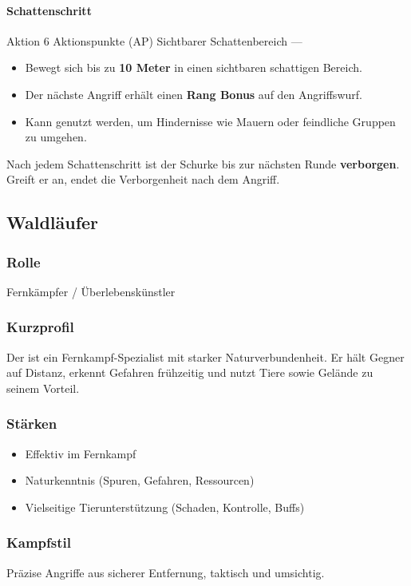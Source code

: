 \paragraph*{Schattenschritt}
\skillcard
{}
{Aktion}
{6 Aktionspunkte (AP)}
{Sichtbarer Schattenbereich}
{—}
{
	\begin{itemize}
		\item Bewegt sich bis zu \textbf{10 Meter} in einen sichtbaren
		schattigen Bereich.
		\item Der nächste Angriff erhält einen \textbf{Rang Bonus}
		auf den Angriffswurf.
		\item Kann genutzt werden, um Hindernisse wie Mauern oder
		feindliche Gruppen zu umgehen.
	\end{itemize}
}
{
	Nach jedem Schattenschritt ist der Schurke bis zur
	nächsten Runde \textbf{verborgen}.
	Greift er an, endet die Verborgenheit nach dem Angriff.
}

\subsection{Waldläufer}

\subsubsection*{Rolle}
Fernkämpfer / Überlebenskünstler

\subsubsection*{Kurzprofil}
Der  ist ein Fernkampf-Spezialist mit starker
Naturverbundenheit. Er hält Gegner auf Distanz, erkennt Gefahren frühzeitig und nutzt
Tiere sowie Gelände zu seinem Vorteil.

\subsubsection*{Stärken}
\begin{itemize}
	\item Effektiv im Fernkampf
	\item Naturkenntnis (Spuren, Gefahren, Ressourcen)
	\item Vielseitige Tierunterstützung (Schaden, Kontrolle, Buffs)
\end{itemize}

\subsubsection*{Kampfstil}
Präzise Angriffe aus sicherer Entfernung, taktisch und umsichtig.

